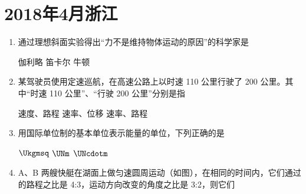 \documentclass[\gkver]{gaokaozhenti}
\begin{document}
\chapter{2018年4月浙江}

\begin{enumerate}
\item
通过理想斜面实验得出“力不是维持物体运动的原因”的科学家是

{伽利略}
{笛卡尔}
{牛顿}


\item
某驾驶员使用定速巡航，在高速公路上以时速 110 公里行驶了 200 公里。其中“时速 110 公里”、“行驶 200 公里”分别是指

{速度、路程}
{速率、位移}
{速率、路程}


\item
用国际单位制的基本单位表示能量的单位，下列正确的是

\fourchoices[answer=A]
{$\Ukg\cdot\Umq/\Usq$}
{$\Ukgmsq$}
{$\UNm$}
{$\UNcdotm$}


\item
A、B 两艘快艇在湖面上做匀速圆周运动（如图），在相同的时间内，它们通过的路程之比是 4:3，运动方向改变的角度之比是 3:2，则它们


\end{enumerate}
\end{document}
